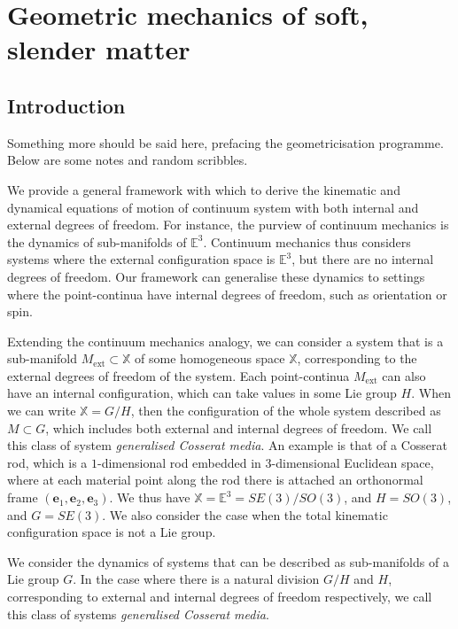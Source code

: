 
\part{Geometric mechanics of soft, slender matter}



\chapter{Introduction}

{\color{red} Something more should be said here, prefacing the geometricisation programme. Below are some notes and random scribbles.}

We provide a general framework with which to derive the kinematic and dynamical equations of motion of continuum system with both internal and external degrees of freedom. For instance, the purview of continuum mechanics is the dynamics of sub-manifolds of $\mathbb{E}^3$. Continuum mechanics thus considers systems where the external configuration space is $\mathbb{E}^3$, but there are no internal degrees of freedom. Our framework can generalise these dynamics to settings where the point-continua have internal degrees of freedom, such as orientation or spin.

Extending the continuum mechanics analogy, we can consider a system that is a sub-manifold $M_\text{ext} \subset \mathbb{X}$ of some homogeneous space $\mathbb{X}$, corresponding to the external degrees of freedom of the system. Each point-continua $M_\text{ext} $ can also have an internal configuration, which can take values in some Lie group $H$. When we can write $\mathbb{X} = G / H$, then the configuration of the whole system described as $M \subset G$, which includes both external and internal degrees of freedom. We call this class of system \textit{generalised Cosserat media}. An example is that of a Cosserat rod, which is a $1$-dimensional rod embedded in $3$-dimensional Euclidean space, where at each material point along the rod there is attached an orthonormal frame $(\mathbf{e}_1, \mathbf{e}_2, \mathbf{e}_3)$. We thus have $\mathbb{X} = \mathbb{E}^3 = SE(3) / SO(3)$, and $H = SO(3)$, and $G = SE(3)$. We also consider the case when the total kinematic configuration space is not a Lie group.

We consider the dynamics of systems that can be described as sub-manifolds of a Lie group $G$. In the case where there is a natural division $G/H$ and $H$, corresponding to external and internal degrees of freedom respectively, we call this class of systems \textit{generalised Cosserat media}.

